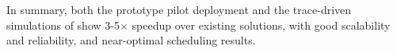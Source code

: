 


In summary, both the prototype pilot deployment and the trace-driven simulations of \name show 3-5$\times$ speedup over existing solutions, with good scalability and reliability, and near-optimal scheduling results.


